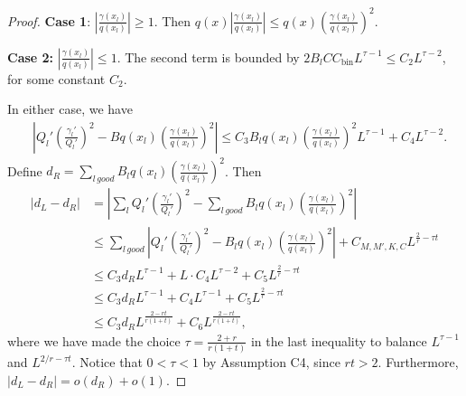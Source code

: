 \documentclass{article}
\newcommand{\bin}{\text{bin}}
\begin{document}
\begin{proof}
\textbf{Case 1}: $\left|\frac{\gamma(x_l)}{q(x_l)}\right| \geq 1$. Then 
$q(x) \left| \frac{\gamma(x_l)}{q(x_l)} \right| 
  \leq q(x) \left( \frac{\gamma(x_l)}{q(x_l)} \right)^2 $.

\textbf{Case 2:} $\left| \frac{\gamma(x_l)}{q(x_l)} \right| \leq 1$. The second term is bounded by $2 B_l CC_\bin L^{\tau - 1 } \leq C_2 L^{\tau - 2}$, for some constant $C_2$.

In either case, we have
\begin{align*}
& \left| Q_l' \left( \frac{\gamma_l'}{Q_l'} \right)^2 
         - B q(x_l) \left( \frac{\gamma(x_l)}{q(x_l)} \right)^2 \right| 
  \leq C_3 B_l q(x_l) \left( \frac{\gamma(x_l)}{q(x_l)} \right)^2  L^{\tau - 1} +
        C_4 L^{\tau - 2}.
\end{align*}
Define $d_R = \sum_{l \, good} B_l q(x_l) \left( \frac{\gamma(x_l)}{q(x_l)} \right)^2$. Then
\begin{align*}
  |d_L - d_R| &= \left| \sum_l Q_l' \left( \frac{\gamma_l'}{Q_l'} \right)^2 - \sum_{l \, good} B_l q(x_l) \left( \frac{\gamma(x_l)}{q(x_l)} \right)^2 \right| \\
  &\leq \sum_{l \, good} \left| Q_l' \left( \frac{\gamma_l'}{Q_l'} \right)^2 - B_l q(x_l) \left( \frac{\gamma(x_l)}{q(x_l)} \right)^2 \right| + C_{M, M', K, C} L^{\frac{2}{r} - \tau t} \\
  &\leq C_3 d_R L^{\tau - 1}
       + L \cdot C_4 L^{\tau - 2}  + C_5 L^{\frac{2}{r} - \tau t} \\
  &\leq  C_3 d_R L^{\tau - 1} 
       +   C_4 L^{\tau - 1}  + C_{5} L^{\frac{2}{r} - \tau t} \\
 &\leq C_3 d_R L^{\frac{2 - rt}{r(1+t)}} 
       +   C_{6} L^{\frac{2 - rt}{r(1+t)} },
\end{align*}
where we have made the choice $\tau= \frac{2 + r}{r(1+t)}$ in the last inequality to balance $L^{\tau - 1}$ and $L^{2/r - \tau t}$. Notice that $0 < \tau < 1$ by Assumption C4, since $rt > 2$. Furthermore, $|d_L - d_R| = o(d_R) + o(1)$.


\end{proof}
\end{document}
